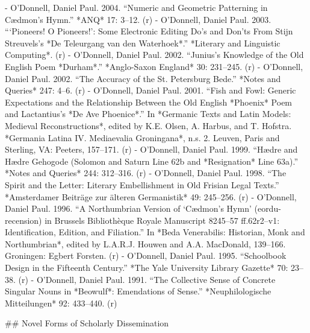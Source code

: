 - O'Donnell, Daniel Paul. 2004. “Numeric and Geometric Patterning in Cædmon’s Hymn.” *ANQ* 17: 3–12. (r)
- O'Donnell, Daniel Paul. 2003. “‘Pioneers! O Pioneers!’: Some Electronic Editing Do’s and Don’ts From Stijn Streuvels’s *De Teleurgang van den Waterhoek*.” *Literary and Linguistic Computing*. (r)
- O'Donnell, Daniel Paul. 2002. “Junius’s Knowledge of the Old English Poem *Durham*.” *Anglo-Saxon England* 30: 231–245. (r)
- O'Donnell, Daniel Paul. 2002. “The Accuracy of the St. Petersburg Bede.” *Notes and Queries* 247: 4–6. (r)
- O'Donnell, Daniel Paul. 2001. “Fish and Fowl: Generic Expectations and the Relationship Between the Old English *Phoenix* Poem and Lactantius’s *De Ave Phoenice*.” In *Germanic Texts and Latin Models: Medieval Reconstructions*, edited by K.E. Olsen, A. Harbus, and T. Hofstra. *Germania Latina IV. Mediaevalia Groningana*, n.s. 2. Leuven, Paris and Sterling, VA: Peeters, 157–171. (r)
- O'Donnell, Daniel Paul. 1999. “Hædre and Hædre Gehogode (Solomon and Saturn Line 62b and *Resignation* Line 63a).” *Notes and Queries* 244: 312–316. (r)
- O'Donnell, Daniel Paul. 1998. “The Spirit and the Letter: Literary Embellishment in Old Frisian Legal Texts.” *Amsterdamer Beiträge zur älteren Germanistik* 49: 245–256. (r)
- O'Donnell, Daniel Paul\*. 1996. “A Northumbrian Version of ‘Cædmon’s Hymn’ (eordu-recension) in Brussels Bibliothèque Royale Manuscript 8245–57 ff.62r2–v1: Identification, Edition, and Filiation.” In *Beda Venerabilis: Historian, Monk and Northumbrian*, edited by L.A.R.J. Houwen and A.A. MacDonald, 139–166. Groningen: Egbert Forsten. (r)
- O'Donnell, Daniel Paul\*. 1995. “Schoolbook Design in the Fifteenth Century.” *The Yale University Library Gazette* 70: 23–38. (r)
- O'Donnell, Daniel Paul\*. 1991. “The Collective Sense of Concrete Singular Nouns in *Beowulf*: Emendations of Sense.” *Neuphilologische Mitteilungen* 92: 433–440. (r)

\sectionbreak{}
## Novel Forms of Scholarly Dissemination

